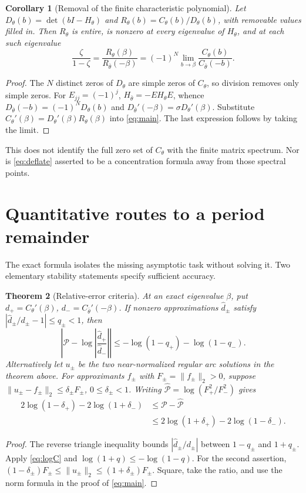 \documentclass[10pt]{article}
\newtheorem{theorem}{Theorem}
\newtheorem{corollary}[theorem]{Corollary}
\begin{document}
\begin{corollary}[Removal of the finite characteristic polynomial]
Let $D_\theta(b)=\det(bI-H_\theta)$ and
$R_\theta(b)=C_\theta(b)/D_\theta(b)$, with removable values filled in.
Then $R_\theta$ is entire, is nonzero at every eigenvalue of $H_\theta$,
and at each such eigenvalue
\begin{equation}
\frac{\zeta}{1-\zeta}
=\frac{R_\theta(\beta)}{R_{\bar\theta}(-\beta)}
=(-1)^N\lim_{b\to\beta}\frac{C_\theta(b)}{C_{\bar\theta}(-b)}.
\label{eq:deflate}
\end{equation}
\end{corollary}
\begin{proof}
The $N$ distinct zeros of $D_\theta$ are simple zeros of $C_\theta$,
so division removes only simple zeros.
For $E_{jj}=(-1)^j$, $H_{\bar\theta}=-EH_\theta E$, whence
$D_{\bar\theta}(-b)=(-1)^ND_\theta(b)$ and
$D_{\bar\theta}'(-\beta)=\sigma D_\theta'(\beta)$.
Substitute $C_\theta'(\beta)=D_\theta'(\beta)R_\theta(\beta)$
into \eqref{eq:main}. The last expression follows by taking the limit.
\end{proof}
This does not identify the full zero set of $C_\theta$ with the finite
matrix spectrum. Nor is \eqref{eq:deflate} asserted to be a concentration
formula away from those spectral points.

\section{Quantitative routes to a period remainder}
The exact formula isolates the missing asymptotic task without solving it.
Two elementary stability statements specify sufficient accuracy.

\begin{theorem}[Relative-error criteria]
At an exact eigenvalue $\beta$, put
$d_+=C_\theta'(\beta)$, $d_-=C_{\bar\theta}'(-\beta)$.
If nonzero approximations $\widehat d_\pm$ satisfy
$|\widehat d_\pm/d_\pm-1|\le q_\pm<1$, then
\begin{equation}
\left|\mathcal P-\log\left|\frac{\widehat d_+}{\widehat d_-}\right|\right|
\le-\log(1-q_+)-\log(1-q_-).
\label{eq:relative}
\end{equation}
Alternatively let $u_\pm$ be the two near-normalized regular arc solutions
in the theorem above. For approximants $f_\pm$ with $F_\pm=\|f_\pm\|_2>0$,
suppose
$\|u_\pm-f_\pm\|_2\le\delta_\pm F_\pm$, $0\le\delta_\pm<1$.
Writing $\widehat{\mathcal P}=\log(F_+^2/F_-^2)$ gives
\begin{align}
2\log(1-\delta_+)-2\log(1+\delta_-)
&\le\mathcal P-\widehat{\mathcal P}\nonumber\\
&\le2\log(1+\delta_+)-2\log(1-\delta_-).
\label{eq:L2}
\end{align}
\end{theorem}
\begin{proof}
The reverse triangle inequality bounds
$|\widehat d_\pm/d_\pm|$ between $1-q_\pm$ and $1+q_\pm$.
Apply \eqref{eq:logC} and
$\log(1+q)\le-\log(1-q)$.
For the second assertion,
$(1-\delta_\pm)F_\pm\le\|u_\pm\|_2\le(1+\delta_\pm)F_\pm$.
Square, take the ratio, and use the norm formula in the proof of
\eqref{eq:main}.
\end{proof}
\end{document}

